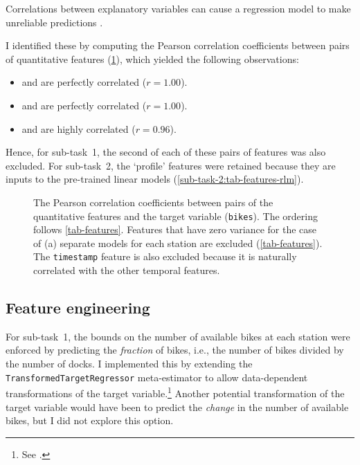 Correlations between explanatory variables can cause a regression model to make
unreliable predictions \parencite{Alin2010}.
\begin{samepage}
	I identified these by computing the Pearson correlation
	coefficients between pairs of quantitative features (\cref{fig-pearson}), which
	yielded the following observations:
	\begin{itemize}
		\item \texttt{\bikesavgfull} and \texttt{\bikesavgshort} are perfectly correlated ($r = 1.00$).
		\item \texttt{\bikeshdiffavgfull} and \texttt{\bikeshdiffavgshort} are perfectly correlated ($r  = 1.00$).
		\item \texttt{\windspeedmax} and \texttt{\windspeedavg} are highly correlated ($r = 0.96$).
	\end{itemize}
\end{samepage}
Hence, for sub-task~1, the second of each of these pairs of features was also excluded.
For sub-task~2, the `profile' features were retained because they are inputs to the
pre-trained linear models (\cref{sub-task-2:tab-features-rlm}).

\begin{figure}
	\centering
	
	\caption{
		The Pearson correlation coefficients between pairs of the quantitative features and
		the target variable (\texttt{bikes}).
		The ordering follows \cref{tab-features}.
		Features that have zero variance for the case of (a) separate models for each station
		are excluded (\cref{tab-features}).
		The \texttt{timestamp} feature is also excluded because it is naturally correlated with
		the other temporal features.
	}
	\label{fig-pearson}
\end{figure}

\subsection{Feature engineering}
\label{sec:data-analysis:feature-engineering}

For sub-task~1, the bounds on the number of available bikes at each station were
enforced by predicting the \emph{fraction} of bikes, i.e., the number of bikes divided
by the number of docks.
I implemented this by extending the \texttt{TransformedTargetRegressor} meta-estimator
to allow data-dependent transformations of the target variable.\footnote{See
	.
}
Another potential transformation of the target variable would have been to predict the
\emph{change} in the number of available bikes, but I did not explore this option.

